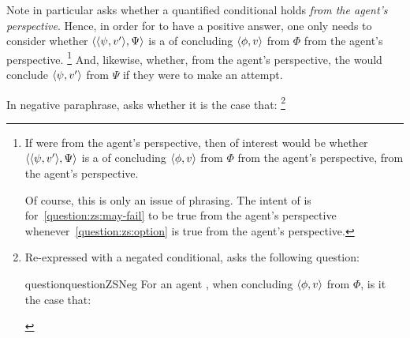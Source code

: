 \begin{note}[\qzS{} \(\forall\)]
  Note in particular \qzS{} asks whether a quantified conditional holds \emph{from the agent's perspective}.
  Hence, in order for \qzS{} to have a positive answer, one only needs to consider whether \(\langle \langle \psi, v' \rangle, \Psi \rangle\) is a \requ{} of concluding \(\langle \phi, v \rangle\) from \(\Phi\) from the agent's perspective.%
  \footnote{
    If  were from the agent's perspective, then of interest would be whether \(\langle \langle \psi, v' \rangle, \Psi \rangle\) is a \requ{} of concluding \(\langle \phi, v \rangle\) from \(\Phi\) from the agent's perspective, from the agent's perspective.

    Of course, this is only an issue of phrasing.
    The intent of \qzS{} is for~\ref{question:zs:may-fail} to be true from the agent's perspective whenever~\ref{question:zs:option} is true from the agent's perspective.
  }
  And, likewise, whether, from the agent's perspective, the would conclude \(\langle \psi, v' \rangle\) from \(\Psi\) if they were to make an attempt.

  In negative paraphrase, \qzS{} asks whether it is the case that:%
  \footnote{
    Re-expressed with a negated conditional, \qzS{} asks the following question:
    \begin{restatable}[\nqzS{}]{question}{questionZSNeg}
      \label{question:zs:neg}
      For an agent \vAgent{}, when concluding \(\langle \phi, v \rangle\) from \(\Phi\), is it the case that:


\end{restatable}}
\end{note}
